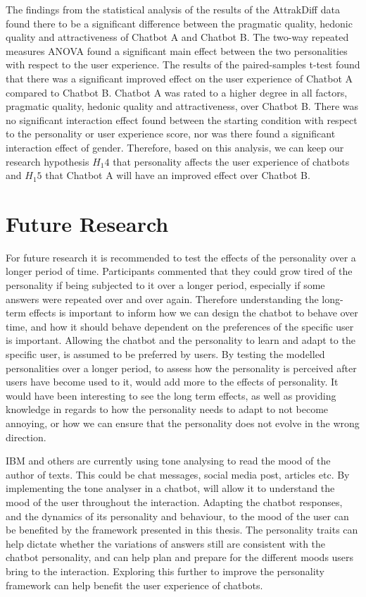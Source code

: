 The findings from the statistical analysis of the results of the AttrakDiff data found there to be a significant difference between the pragmatic quality, hedonic quality and attractiveness of Chatbot A and Chatbot B. The two-way repeated measures ANOVA found a significant main effect between the two personalities with respect to the user experience. The results of the paired-samples t-test found that there was a significant improved effect on the user experience of Chatbot A compared to Chatbot B. Chatbot A was rated to a higher degree in all factors, pragmatic quality, hedonic quality and attractiveness, over Chatbot B. There was no significant interaction effect found between the starting condition with respect to the personality or user experience score, nor was there found a significant interaction effect of gender. Therefore, based on this analysis, we can keep our research hypothesis $H_1 4$ that personality affects the user experience of chatbots and $H_1 5$ that Chatbot A will have an improved effect over Chatbot B. 

\vspace{5mm}

\section{Future Research}
\label{sec:future}

For future research it is recommended to test the effects of the personality over a longer period of time. Participants commented that they could grow tired of the personality if being subjected to it over a longer period, especially if some answers were repeated over and over again. Therefore understanding the long-term effects is important to inform how we can design the chatbot to behave over time, and how it should behave dependent on the preferences of the specific user is important. Allowing the chatbot and the personality to learn and adapt to the specific user, is assumed to be preferred by users. By testing the modelled personalities over a longer period, to assess how the personality is perceived after users have become used to it, would add more to the effects of personality. It would have been interesting to see the long term effects, as well as providing knowledge in regards to how the personality needs to adapt to not become annoying, or how we can ensure that the personality does not evolve in the wrong direction.

IBM and others are currently using tone analysing to read the mood of the author of texts. This could be chat messages, social media post, articles etc. By implementing the tone analyser in a chatbot, will allow it to understand the mood of the user throughout the interaction. Adapting the chatbot responses, and the dynamics of its personality and behaviour, to the mood of the user can be benefited by the framework presented in this thesis. The personality traits can help dictate whether the variations of answers still are consistent with the chatbot personality, and can help plan and prepare for the different moods users bring to the interaction. Exploring this further to improve the personality framework can help benefit the user experience of chatbots.

